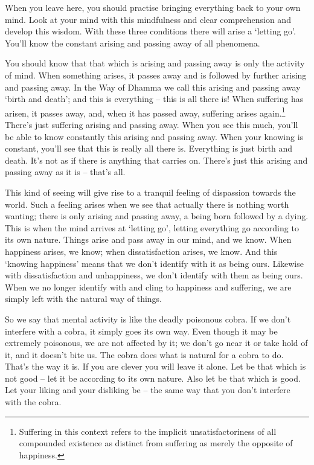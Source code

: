 When you leave here, you should practise bringing everything back to your own mind. Look at your mind with this mindfulness and clear comprehension and develop this wisdom. With these three conditions there will arise a `letting go'. You'll know the constant arising and passing away of all phenomena. 

You should know that that which is arising and passing away is only the activity of mind. When something arises, it passes away and is followed by further arising and passing away. In the Way of Dhamma we call this arising and passing away `birth and death'; and this is everything -- this is all there is! When suffering has arisen, it passes away, and, when it has passed away, suffering arises again.\footnote{Suffering in this context refers to the implicit unsatisfactoriness of all compounded existence as distinct from suffering as merely the opposite of happiness.} There's just suffering arising and passing away. When you see this much, you'll be able to know constantly this arising and passing away. When your knowing is constant, you'll see that this is really all there is. Everything is just birth and death. It's not as if there is anything that carries on. There's just this arising and passing away as it is -- that's all. 

This kind of seeing will give rise to a tranquil feeling of dispassion towards the world. Such a feeling arises when we see that actually there is nothing worth wanting; there is only arising and passing away, a being born followed by a dying. This is when the mind arrives at `letting go', letting everything go according to its own nature. Things arise and pass away in our mind, and we know. When happiness arises, we know; when dissatisfaction arises, we know. And this `knowing happiness' means that we don't identify with it as being ours. Likewise with dissatisfaction and unhappiness, we don't identify with them as being ours. When we no longer identify with and cling to happiness and suffering, we are simply left with the natural way of things. 

So we say that mental activity is like the deadly poisonous cobra. If we don't interfere with a cobra, it simply goes its own way. Even though it may be extremely poisonous, we are not affected by it; we don't go near it or take hold of it, and it doesn't bite us. The cobra does what is natural for a cobra to do. That's the way it is. If you are clever you will leave it alone. Let be that which is not good -- let it be according to its own nature. Also let be that which is good. Let your liking and your disliking be -- the same way that you don't interfere with the cobra.

